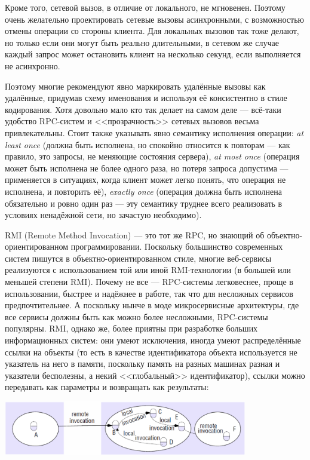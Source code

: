 \documentclass{../../text-style}
\begin{document}
Кроме того, сетевой вызов, в отличие от локального, не мгновенен. Поэтому очень желательно проектировать сетевые вызовы асинхронными, с возможностью отмены операции со стороны клиента. Для локальных вызовов так тоже делают, но только если они могут быть реально длительными, в сетевом же случае каждый запрос может остановить клиент на несколько секунд, если выполняется не асинхронно.

Поэтому многие рекомендуют явно маркировать удалённые вызовы как удалённые, придумав схему именования и используя её консистентно в стиле кодирования. Хотя довольно мало кто так делает на самом деле --- всё-таки удобство RPC-систем и <<прозрачность>> сетевых вызовов весьма привлекательны. Стоит также указывать явно семантику исполнения операции: \emph{at least once} (должна быть исполнена, но спокойно относится к повторам --- как правило, это запросы, не меняющие состояния сервера), \emph{at most once} (операция может быть исполнена не более одного раза, но потеря запроса допустима --- применяется в ситуациях, когда клиент может легко понять, что операция не исполнена, и повторить её), \emph{exactly once} (операция должна быть исполнена обязательно и ровно один раз --- эту семантику труднее всего реализовать в условиях ненадёжной сети, но зачастую необходимо).

RMI (Remote Method Invocation) --- это тот же RPC, но знающий об объектно-ориентированном программировании. Поскольку большинство современных систем пишутся в объектно-ориентированном стиле, многие веб-сервисы реализуются с использованием той или иной RMI-технологии (в большей или меньшей степени RMI). Почему не все --- RPC-системы легковеснее, проще в использовании, быстрее и надёжнее в работе, так что для несложных сервисов предпочтительнее. А поскольку нынче в моде микросервисные архитектуры, где все сервисы должны быть как можно более несложными, RPC-системы популярны. RMI, однако же, более приятны при разработке больших информационных систем: они умеют исключения, иногда умеют распределённые ссылки на объекты (то есть в качестве идентификатора объекта используется не указатель на него в памяти, поскольку память на разных машинах разная и указатели бесполезны, а некий <<глобальный>> идентификатор), ссылки можно передавать как параметры и возвращать как результаты:

\begin{center}
    \includegraphics[width=0.8\textwidth]{remoteCalls.png}
\end{center}
\end{document}

